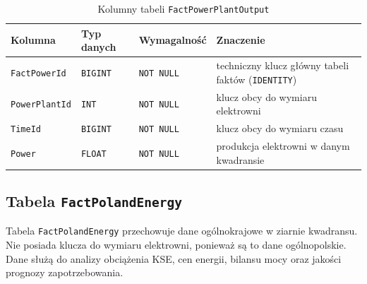 \documentclass[12pt]{article}
\begin{document}
	\begin{table}[H]
		\centering
		\small
		\begin{tabularx}{\textwidth}{|p{3.1cm}|p{2.2cm}|p{1.7cm}|X|}
			\hline
			\textbf{Kolumna} & \textbf{Typ danych} & \textbf{Wymagalność} & \textbf{Znaczenie} \\
			\hline
			\texttt{FactPowerId} & \texttt{BIGINT} & \texttt{NOT NULL} & techniczny klucz główny tabeli faktów (\texttt{IDENTITY}) \\
			\hline
			\texttt{PowerPlantId} & \texttt{INT} & \texttt{NOT NULL} & klucz obcy do wymiaru elektrowni \\
			\hline
			\texttt{TimeId} & \texttt{BIGINT} & \texttt{NOT NULL} & klucz obcy do wymiaru czasu \\
			\hline
			\texttt{Power} & \texttt{FLOAT} & \texttt{NOT NULL} & produkcja elektrowni w danym kwadransie \\
			\hline
		\end{tabularx}
		\caption{Kolumny tabeli \texttt{FactPowerPlantOutput}}
	\end{table}

	\subsection{Tabela \texttt{FactPolandEnergy}}

	Tabela \texttt{FactPolandEnergy} przechowuje dane ogólnokrajowe w ziarnie kwadransu. Nie posiada klucza do wymiaru elektrowni, ponieważ są to dane ogólnopolskie. Dane służą do analizy obciążenia KSE, cen energii, bilansu mocy oraz jakości prognozy zapotrzebowania.
\end{document}
